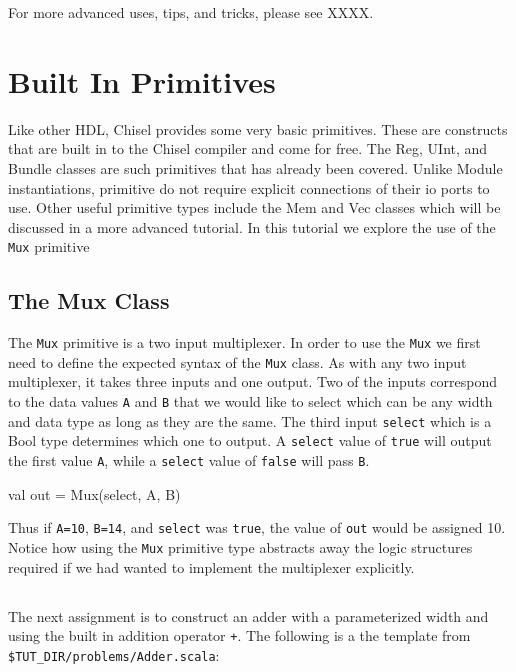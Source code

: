 For more advanced uses, tips, and tricks, please see XXXX.

\section{Built In Primitives}

Like other HDL, Chisel provides some very basic primitives. These are constructs that are built in to the Chisel compiler and come for free. The Reg, UInt, and Bundle classes are such primitives that has already been covered. Unlike Module instantiations, primitive do not require explicit connections of their io ports to use. Other useful primitive types include the Mem and Vec classes which will be discussed in a more advanced tutorial. In this tutorial we explore the use of the \verb+Mux+ primitive

\subsection{The Mux Class}

The \verb+Mux+ primitive is a two input multiplexer. In order to use the \verb+Mux+ we first need to define the expected syntax of the \verb+Mux+ class. As with any two input multiplexer, it takes three inputs and one output. Two of the inputs correspond to the data values \verb+A+ and \verb+B+ that we would like to select which can be any width and data type as long as they are the same. The third input \verb+select+ which is a Bool type determines which one to output.
A \verb+select+ value of \verb+true+ will output the first value \verb+A+, while a \verb+select+ value of \verb+false+ will pass \verb+B+.

\begin{scala}
val out = Mux(select, A, B)
\end{scala}

Thus if \verb+A=10+, \verb+B=14+, and \verb+select+ was \verb+true+, the value of \verb+out+ would be assigned 10. Notice how using the \verb+Mux+ primitive type abstracts away the logic structures required if we had wanted to implement the multiplexer explicitly.

\subsection{}

The next assignment is to construct an adder with a parameterized width and using the built in addition operator \verb!+!.
The following is a the template from \verb+$TUT_DIR/problems/Adder.scala+:

